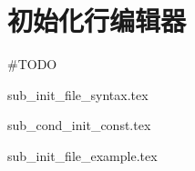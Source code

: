 \section{初始化行编辑器}

\#TODO

{sub_init_file_syntax.tex}

{sub_cond_init_const.tex}

{sub_init_file_example.tex}
